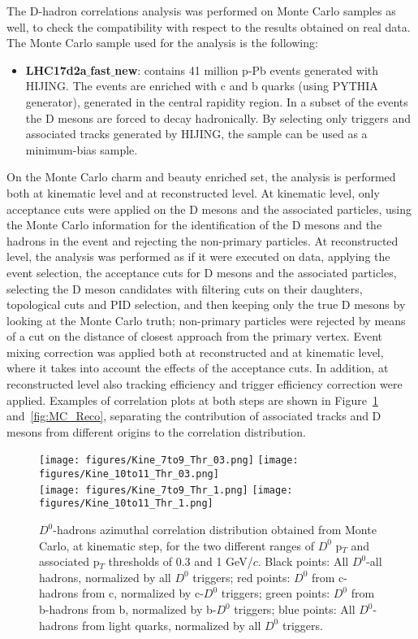 The D-hadron correlations analysis was performed on Monte Carlo samples as well, to check the compatibility with respect to the results obtained on real data.
The Monte Carlo sample used for the analysis is the following:
\begin{itemize}
    \item \textbf{LHC17d2a$\_$fast$\_$new}: contains 41 million p-Pb events generated with HIJING. The events are enriched with c and b quarks (using PYTHIA generator), generated in the central rapidity region. In a subset of the events the D mesons are forced to decay hadronically. By selecting only triggers and associated tracks generated by HIJING, the sample can be used as a minimum-bias sample.
\end{itemize}
On the Monte Carlo charm and beauty enriched set, the analysis is performed both at kinematic level and at reconstructed level. At kinematic level, only acceptance cuts were applied on the D mesons and the associated particles, using the Monte Carlo information for the identification of the D mesons and the hadrons in the event and rejecting the non-primary particles. At reconstructed level, the analysis was performed as if it were executed on data, applying the event selection, the acceptance cuts for D mesons and the associated particles, selecting the D meson candidates with filtering cuts on their daughters, topological cuts and PID selection, and then keeping only the true D mesons by looking at the Monte Carlo truth; non-primary particles were rejected by means of a cut on the distance of closest approach from the primary vertex. Event mixing correction was applied both at reconstructed and at kinematic level, where it takes into account the effects of the acceptance cuts. In addition, at reconstructed level also tracking efficiency and trigger efficiency correction were applied. Examples of correlation plots at both steps are shown in Figure~\ref{fig:MC_Kine} and~\ref{fig:MC_Reco}, separating the contribution of associated tracks and D mesons from different origins to the correlation distribution.
\clearpage
\begin{figure}
{\texttt{[image: figures/Kine\_7to9\_Thr\_03.png]}}
{\texttt{[image: figures/Kine\_10to11\_Thr\_03.png]}} \\
{\texttt{[image: figures/Kine\_7to9\_Thr\_1.png]}}
{\texttt{[image: figures/Kine\_10to11\_Thr\_1.png]}}
\caption{$D^0$-hadrons azimuthal correlation distribution obtained from Monte Carlo, at kinematic step, for the two different ranges of $D^0$ p$_T$ and associated p$_T$ thresholds of 0.3 and 1 GeV/$c$. Black points: All $D^0$-all hadrons, normalized by all $D^0$ triggers; red points: $D^0$ from c-hadrons from c, normalized by c-$D^0$ triggers; green points: $D^0$ from b-hadrons from b, normalized by b-$D^0$ triggers; blue points: All $D^0$-hadrons from light quarks, normalized by all $D^0$ triggers.}
\label{fig:MC_Kine}
\end{figure}

